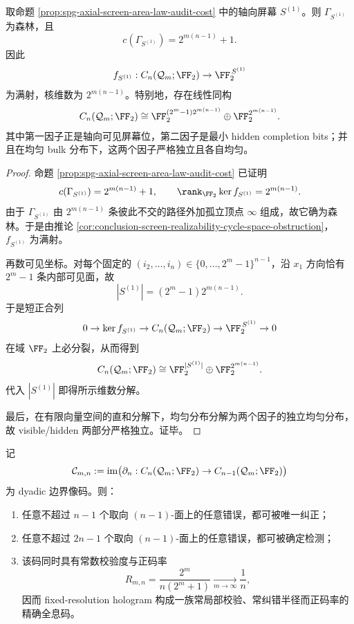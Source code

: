 \begin{corollary}\label{cor:conclusion-axial-screen-direct-sum-visible-hidden-split}
取命题 \ref{prop:spg-axial-screen-area-law-audit-cost} 中的轴向屏幕 \(S^{(1)}\)。则 \(\Gamma_{S^{(1)}}\) 为森林，且
\[
c(\Gamma_{S^{(1)}})=2^{m(n-1)}+1.
\]
因此
\[
f_{S^{(1)}}:C_n(\mathcal Q_m;\FF_2)\to \FF_2^{\,S^{(1)}}
\]
为满射，核维数为 \(2^{m(n-1)}\)。特别地，存在线性同构
\[
C_n(\mathcal Q_m;\FF_2)
\cong
\FF_2^{(2^m-1)2^{m(n-1)}}
\oplus
\FF_2^{2^{m(n-1)}}.
\]
其中第一因子正是轴向可见屏幕位，第二因子是最小 hidden completion bits；并且在均匀 bulk 分布下，这两个因子严格独立且各自均匀。
\end{corollary}

\begin{proof}
命题 \ref{prop:spg-axial-screen-area-law-audit-cost} 已证明
\[
c(\Gamma_{S^{(1)}})=2^{m(n-1)}+1,
\qquad
\rank_{\FF_2}\ker f_{S^{(1)}}=2^{m(n-1)}.
\]
由于 \(\Gamma_{S^{(1)}}\) 由 \(2^{m(n-1)}\) 条彼此不交的路径外加孤立顶点 \(\infty\) 组成，故它确为森林。于是由推论 \ref{cor:conclusion-screen-realizability-cycle-space-obstruction}，\(f_{S^{(1)}}\) 为满射。

再数可见坐标。对每个固定的 \((i_2,\dots,i_n)\in\{0,\dots,2^m-1\}^{n-1}\)，沿 \(x_1\) 方向恰有 \(2^m-1\) 条内部可见面，故
\[
|S^{(1)}|=(2^m-1)2^{m(n-1)}.
\]
于是短正合列
\[
0\to \ker f_{S^{(1)}}\to C_n(\mathcal Q_m;\FF_2)\to \FF_2^{\,S^{(1)}}\to 0
\]
在域 \(\FF_2\) 上必分裂，从而得到
\[
C_n(\mathcal Q_m;\FF_2)
\cong
\FF_2^{|S^{(1)}|}
\oplus
\FF_2^{2^{m(n-1)}}.
\]
代入 \(|S^{(1)}|\) 即得所示维数分解。

最后，在有限向量空间的直和分解下，均匀分布分解为两个因子的独立均匀分布，故 visible/hidden 两部分严格独立。证毕。
\end{proof}

\begin{corollary}\label{cor:conclusion-fixed-resolution-hologram-exact-error-radius}
记
\[
\mathcal C_{m,n}:=\operatorname{im}\bigl(\partial_n:C_n(\mathcal Q_m;\FF_2)\to C_{n-1}(\mathcal Q_m;\FF_2)\bigr)
\]
为 dyadic 边界像码。则：
\begin{enumerate}
  \item 任意不超过 \(n-1\) 个取向 \((n-1)\)-面上的任意错误，都可被唯一纠正；
  \item 任意不超过 \(2n-1\) 个取向 \((n-1)\)-面上的任意错误，都可被确定检测；
  \item 该码同时具有常数校验度与正码率
        \[
        R_{m,n}=\frac{2^m}{n(2^m+1)}\xrightarrow[m\to\infty]{}\frac1n,
        \]
        因而 fixed-resolution hologram 构成一族常局部校验、常纠错半径而正码率的精确全息码。
\end{enumerate}
\end{corollary}

